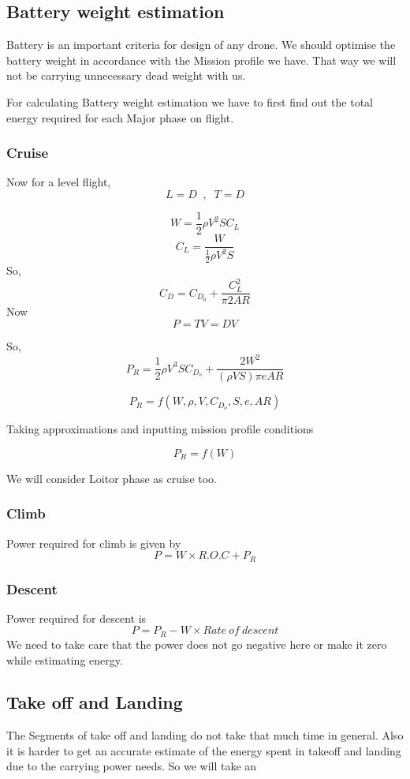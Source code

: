 \documentclass[12 pt]{article}
\begin{document}
\newpage

\subsection{Battery weight estimation}

Battery is an important criteria for design of any drone. We should optimise the battery weight in accordance with the Mission profile we have. That way we will not be carrying unnecessary dead weight with us.

For calculating Battery weight estimation we have to first find out the total energy required for each Major phase on flight.

\subsubsection{Cruise}
Now for a level flight,
$$ L = D \; \; , \; \; T = D$$

$$ W = \frac{1}{2} \rho V^2 S C_L $$
$$ C_L = \frac{W}{\frac{1}{2} \rho V^2 S}$$
So,
$$ C_D = C_{D_0} + \frac{C_L^2}{\pi 2 AR} $$
Now 
$$ P = TV = DV $$

So, 
$$ P_R = \frac{1}{2}\rho V^3 S C_{D_o} + \frac{2 W^2}{ (\rho V S) \pi e AR} $$

$$P_R = f(W,\rho,V,C_{D_o},S,e,AR)$$

Taking approximations and inputting mission profile conditions

$$ P_R = f(W) $$

We will consider Loitor phase as cruise too.

\subsubsection{Climb }
Power required for climb is given by 
$$ P = W \times R.O.C + P_R $$

\subsubsection{Descent}
Power required for descent is 
$$ P = P_R - W \times Rate\: of\: descent$$
We need to take care that the power does not go negative here or make it zero while estimating energy.

\subsection{Take off and Landing}
The Segments of take off and landing do not take that much time in general. Also it is harder to get an accurate estimate of the energy spent in takeoff and landing due to the carrying power needs. So we will take an 
\end{document}
